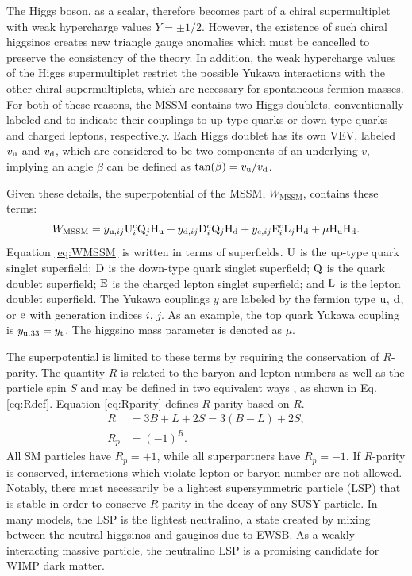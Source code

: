 The Higgs boson, as a scalar, therefore becomes part of a chiral supermultiplet with weak hypercharge values $Y = \pm 1/2$. However, the existence of such chiral higgsinos creates new triangle gauge anomalies which must be cancelled to preserve the consistency of the theory. In addition, the weak hypercharge values of the Higgs supermultiplet restrict the possible Yukawa interactions with the other chiral supermultiplets, which are necessary for spontaneous fermion masses. For both of these reasons, the MSSM contains two Higgs doublets, conventionally labeled \Hone and \Htwo to indicate their couplings to up-type quarks or down-type quarks and charged leptons, respectively. Each Higgs doublet has its own VEV, labeled $v_{\mathrm{u}}$ and $v_{\mathrm{d}}$, which are considered to be two components of an underlying $v$, implying an angle $\beta$ can be defined as $\text{tan}(\beta) = v_{\mathrm{u}}/v_{\mathrm{d}}$.

Given these details, the superpotential of the MSSM, $W_{\text{MSSM}}$, contains these terms:
\begin{equation}
W_{\text{MSSM}} = y_{\mathrm{u},ij}\mathrm{U}_{i}^{c}\mathrm{Q}_{j}\mathrm{H}_\mathrm{u} + y_{\mathrm{d},ij}\mathrm{D}_{i}^{c}\mathrm{Q}_{j}\mathrm{H}_\mathrm{d} + y_{\mathrm{e},ij}\mathrm{E}_{i}^{c}\mathrm{L}_{j}\mathrm{H}_\mathrm{d} + \mu \mathrm{H}_\mathrm{u} \mathrm{H}_\mathrm{d}. \label{eq:WMSSM}
\end{equation}
Equation \eqref{eq:WMSSM} is written in terms of superfields. $\mathrm{U}$ is the up-type quark singlet superfield; $\mathrm{D}$ is the down-type quark singlet superfield; $\mathrm{Q}$ is the quark doublet superfield; $\mathrm{E}$ is the charged lepton singlet superfield; and $\mathrm{L}$ is the lepton doublet superfield. The Yukawa couplings $y$ are labeled by the fermion type $\mathrm{u}$, $\mathrm{d}$, or $\mathrm{e}$ with generation indices $i$, $j$. As an example, the top quark Yukawa coupling is $y_{\mathrm{u},33} = y_{\mathrm{t}}$. The higgsino mass parameter is denoted as $\mu$.

The superpotential is limited to these terms by requiring the conservation of $R$-parity. The quantity $R$ is related to the baryon and lepton numbers as well as the particle spin $S$ and may be defined in two equivalent ways \cite{Barbier}, as shown in Eq. \eqref{eq:Rdef}. Equation \eqref{eq:Rparity} defines $R$-parity based on $R$.
\begin{align}
R &= 3B+L+2S = 3(B-L)+2S, \label{eq:Rdef} \\
R_{p} &= (-1)^{R}. \label{eq:Rparity}
\end{align}
All SM particles have $R_{p} = +1$, while all superpartners have $R_{p} = -1$. If $R$-parity is conserved, interactions which violate lepton or baryon number are not allowed. Notably, there must necessarily be a lightest supersymmetric particle (LSP) that is stable in order to conserve $R$-parity in the decay of any SUSY particle. In many models, the LSP is the lightest neutralino, a state created by mixing between the neutral higgsinos and gauginos due to EWSB. As a weakly interacting massive particle, the neutralino LSP is a promising candidate for WIMP dark matter.

